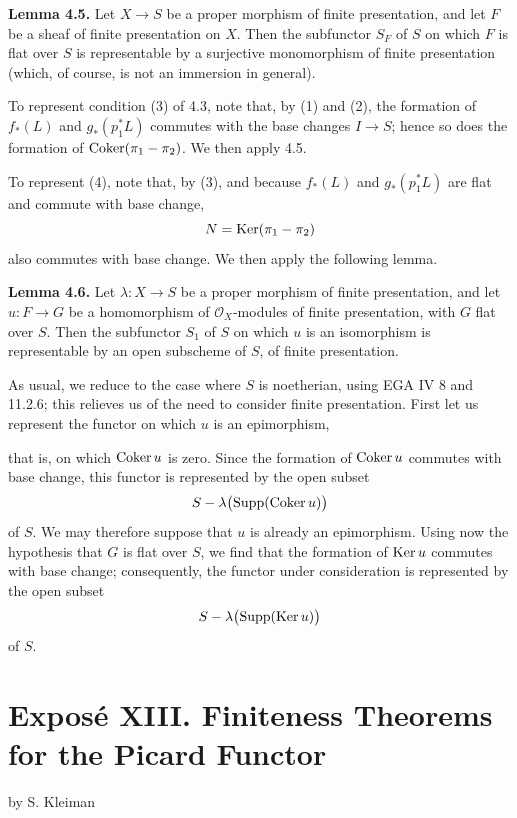 \textbf{Lemma 4.5.} Let \(X\to S\) be a proper morphism of finite
presentation, and let \(F\) be a sheaf of finite presentation on \(X\). Then
the subfunctor \(S_F\) of \(S\) on which \(F\) is flat over \(S\) is
representable by a surjective monomorphism of finite presentation (which, of
course, is not an immersion in general).

To represent condition (3) of 4.3, note that, by (1) and (2), the formation
of \(f_*(L)\) and \(g_*(p_1^*L)\) commutes with the base changes
\(I\to S\); hence so does the formation of
\(\operatorname{Coker}(\pi_1-\pi_2)\). We then apply 4.5.

To represent (4), note that, by (3), and because \(f_*(L)\) and
\(g_*(p_1^*L)\) are flat and commute with base change,
\[
  N=\operatorname{Ker}(\pi_1-\pi_2)
\]
also commutes with base change. We then apply the following lemma.

\textbf{Lemma 4.6.} Let \(\lambda:X\to S\) be a proper morphism of finite
presentation, and let \(u:F\to G\) be a homomorphism of
\(\mathcal O_X\)-modules of finite presentation, with \(G\) flat over
\(S\). Then the subfunctor \(S_1\) of \(S\) on which \(u\) is an
isomorphism is representable by an open subscheme of \(S\), of finite
presentation.

As usual, we reduce to the case where \(S\) is noetherian, using EGA IV 8
and 11.2.6; this relieves us of the need to consider finite presentation.
First let us represent the functor on which \(u\) is an epimorphism,

\newpage
that is, on which \(\operatorname{Coker} u\) is zero. Since the formation of
\(\operatorname{Coker} u\) commutes with base change, this functor is represented by the
open subset
\[
  S-\lambda\bigl(\operatorname{Supp}(\operatorname{Coker} u)\bigr)
\]
of \(S\). We may therefore suppose that \(u\) is already an epimorphism.
Using now the hypothesis that \(G\) is flat over \(S\), we find that the
formation of \(\operatorname{Ker} u\) commutes with base change; consequently, the functor
under consideration is represented by the open subset
\[
  S-\lambda\bigl(\operatorname{Supp}(\operatorname{Ker} u)\bigr)
\]
of \(S\).

\newpage
\section*{Expos\'e XIII. Finiteness Theorems for the Picard Functor}
\begin{center}
by S. Kleiman
\end{center}


